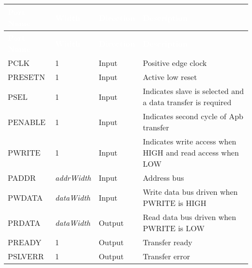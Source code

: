 \begingroup
\small
{} %
\begin{longtable}[H]{
  | p{}
  | p{}
  | p{}
  | p{} |
  }

  \hline
  \rowcolor{dark-gray}
  \textcolor{white}{\textbf{Port Name}} & 
  \textcolor{white}{\textbf{Width}} & 
  \textcolor{white}{\textbf{Direction}} & 
  \textcolor{white}{\textbf{Description}} \\ \hline
  \endfirsthead

  \hline
  \rowcolor{dark-gray}
  \textcolor{white}{\textbf{Port Name}} & 
  \textcolor{white}{\textbf{Width}} & 
  \textcolor{white}{\textbf{Direction}} & 
  \textcolor{white}{\textbf{Description}}\\ \hline
  \endhead

  \hline
  \endfoot


  PCLK &       
  1 &       
  Input &       
  Positive edge clock \\ \hline

  PRESETN &       
  1 &       
  Input &       
  Active low reset \\ \hline

  PSEL &       
  1 & 
  Input &       
  Indicates slave is selected and a data transfer is required \\ \hline

  PENABLE &        
  1 & 
  Input &       
  Indicates second cycle of Apb transfer \\ \hline

  PWRITE &        
  1 & 
  Input &       
  Indicates write access when HIGH and read access when LOW\\ \hline

  PADDR &      
  \textit{addrWidth} & 
  Input &     
  Address bus \\ \hline

  PWDATA &      
  \textit{dataWidth} & 
  Input &     
  Write data bus driven when PWRITE is HIGH\\ \hline

  PRDATA &      
  \textit{dataWidth} & 
  Output &     
  Read data bus driven when PWRITE is LOW\\ \hline
 
  PREADY &        
  1 & 
  Output &       
  Transfer ready \\ \hline

  PSLVERR &        
  1 & 
  Output &       
  Transfer error \\ \hline
  
\end{longtable}
\captionsetup{aboveskip=0pt}
\label{table:interface}
\endgroup
